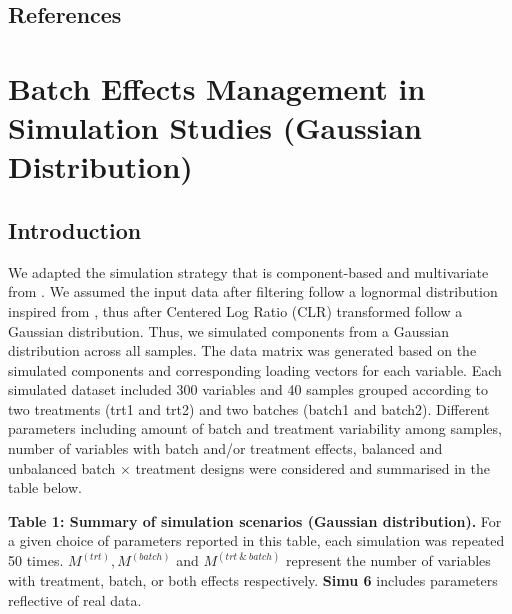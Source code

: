 \documentclass[
]{book}
\begin{document}
\hypertarget{references-1}{%
\section{References}\label{references-1}}

\hypertarget{batch-effects-management-in-simulation-studies-gaussian-distribution}{%
\chapter{Batch Effects Management in Simulation Studies (Gaussian Distribution)}\label{batch-effects-management-in-simulation-studies-gaussian-distribution}}

\hypertarget{introduction-1}{%
\section{Introduction}\label{introduction-1}}

We adapted the simulation strategy that is component-based and multivariate from \citep{singh2019diablo}. We assumed the input data after filtering follow a lognormal distribution inspired from \citep{weiss2017normalization}, thus after Centered Log Ratio (CLR) transformed follow a Gaussian distribution. Thus, we simulated components from a Gaussian distribution across all samples. The data matrix was generated based on the simulated components and corresponding loading vectors for each variable. Each simulated dataset included 300 variables and 40 samples grouped according to two treatments (trt1 and trt2) and two batches (batch1 and batch2). Different parameters including amount of batch and treatment variability among samples, number of variables with batch and/or treatment effects, balanced and unbalanced batch \(\times\) treatment designs were considered and summarised in the table below.

\textbf{Table 1: Summary of simulation scenarios (Gaussian distribution).} For a given choice of parameters reported in this table, each simulation was repeated 50 times. \(M^{(trt)}, M^{(batch)}\) and \(M^{(trt \ \& \ batch)}\) represent the number of variables with treatment, batch, or both effects respectively. \textbf{Simu 6} includes parameters reflective of real data.
\end{document}
